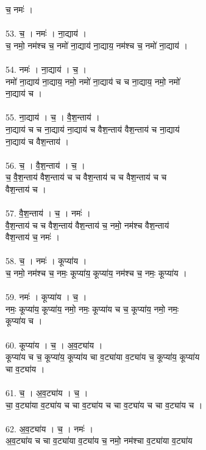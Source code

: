 च॒ नमः॑ ।\\
\\
53. च॒ । नमः॑ । ना॒द्याय॑ ।\\
च॒ नमो॒ नम॑श्च च॒ नमो॑ ना॒द्याय॑ ना॒द्याय॒ नम॑श्च च॒ नमो॑ ना॒द्याय॑ ।\\
\\
54. नमः॑ । ना॒द्याय॑ । च॒ ।\\
नमो॑ ना॒द्याय॑ ना॒द्याय॒ नमो॒ नमो॑ ना॒द्याय॑ च च ना॒द्याय॒ नमो॒ नमो॑\\
ना॒द्याय॑ च ।\\
\\
55. ना॒द्याय॑ । च॒ । वै॒श॒न्ताय॑ ।\\
ना॒द्याय॑ च च ना॒द्याय॑ ना॒द्याय॑ च वैश॒न्ताय॑ वैश॒न्ताय॑ च ना॒द्याय॑\\
ना॒द्याय॑ च वैश॒न्ताय॑ ।\\
\\
56. च॒ । वै॒श॒न्ताय॑ । च॒ ।\\
च॒ वै॒श॒न्ताय॑ वैश॒न्ताय॑ च च वैश॒न्ताय॑ च च वैश॒न्ताय॑ च च\\
वैश॒न्ताय॑ च ।\\
\\
57. वै॒श॒न्ताय॑ । च॒ । नमः॑ ।\\
वै॒श॒न्ताय॑ च च वैश॒न्ताय॑ वैश॒न्ताय॑ च॒ नमो॒ नम॑श्च वैश॒न्ताय॑\\
वैश॒न्ताय॑ च॒ नमः॑ ।\\
\\
58. च॒ । नमः॑ । कूप्या॑य ।\\
च॒ नमो॒ नम॑श्च च॒ नमः॒ कूप्या॑य॒ कूप्या॑य॒ नम॑श्च च॒ नमः॒ कूप्या॑य ।\\
\\
59. नमः॑ । कूप्या॑य । च॒ ।\\
नमः॒ कूप्या॑य॒ कूप्या॑य॒ नमो॒ नमः॒ कूप्या॑य च च॒ कूप्या॑य॒ नमो॒ नमः॒\\
कूप्या॑य च ।\\
\\
60. कूप्या॑य । च॒ । अ॒व॒ट्या॑य ।\\
कूप्या॑य च च॒ कूप्या॑य॒ कूप्या॑य चा व॒ट्या॑या व॒ट्या॑य च॒ कूप्या॑य॒ कूप्या॑य\\
चा व॒ट्या॑य ।\\
\\
61. च॒ । अ॒व॒ट्या॑य । च॒ ।\\
चा॒ व॒ट्या॑या व॒ट्या॑य च चा व॒ट्या॑य च चा व॒ट्या॑य च चा व॒ट्या॑य च ।\\
\\
62. अ॒व॒ट्या॑य । च॒ । नमः॑ ।\\
अ॒व॒ट्या॑य च चा व॒ट्या॑या व॒ट्या॑य च॒ नमो॒ नम॑श्चा व॒ट्या॑या व॒ट्या॑य\\
